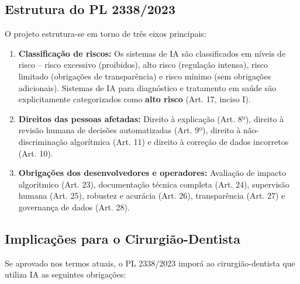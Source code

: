 
\subsection{Estrutura do PL 2338/2023}

O projeto estrutura-se em torno de três eixos principais:

\begin{enumerate}
  \item \textbf{Classificação de riscos:} Os sistemas de IA são classificados
    em níveis de risco -- risco excessivo (proibidos), alto risco (regulação
    intensa), risco limitado (obrigações de transparência) e risco mínimo (sem
    obrigações adicionais). Sistemas de IA para diagnóstico e tratamento em
    saúde são explicitamente categorizados como \textbf{alto risco} (Art. 17,
    inciso I).

  \item \textbf{Direitos das pessoas afetadas:} Direito à explicação (Art. 8º),
    direito à revisão humana de decisões automatizadas (Art. 9º), direito à
    não-discriminação algorítmica (Art. 11) e direito à correção de dados
    incorretos (Art. 10).

  \item \textbf{Obrigações dos desenvolvedores e operadores:} Avaliação de
    impacto algorítmico (Art. 23), documentação técnica completa (Art. 24),
    supervisão humana (Art. 25), robustez e acurácia (Art. 26), transparência
    (Art. 27) e governança de dados (Art. 28).
\end{enumerate}

\subsection{Implicações para o Cirurgião-Dentista}

Se aprovado nos termos atuais, o PL 2338/2023 imporá ao cirurgião-dentista que
utiliza IA as seguintes obrigações:

